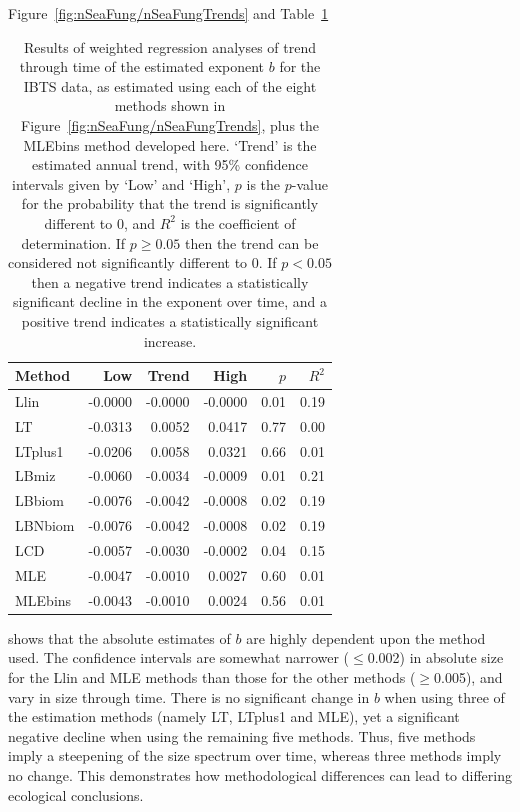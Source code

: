 \documentclass[12pt, letter]{article}
\begin{document}
Figure~\ref{fig:nSeaFung/nSeaFungTrends} and Table~\ref{tab:trendRes}
\begin{table}[tp]
\centering
\caption{Results of weighted regression analyses of trend through time of the
  estimated exponent $b$ for the IBTS data,
  as estimated using each of the eight methods shown
  in Figure~\ref{fig:nSeaFung/nSeaFungTrends}, plus the MLEbins method
  developed here.
  `Trend' is the estimated annual
  trend, with 95\% confidence intervals given by `Low' and `High', $p$ is the
  $p$-value for the probability that the trend is significantly different to 0,
  and $R^2$ is the coefficient of determination. If $p \geq 0.05$ then the
  trend can be considered not significantly different to 0. If $p<0.05$ then a
  negative trend indicates a statistically significant decline in the exponent
  over time, and a positive trend indicates a statistically significant
  increase.}
\label{tab:trendRes}
\begin{tabular}{lrrrrr}
\hline Method & Low & Trend & High & $p$ & $R^2$ \\    %
\hline
Llin & -0.0000 & -0.0000 & -0.0000 & 0.01 & 0.19 \\    %
LT & -0.0313 & 0.0052 & 0.0417 & 0.77 & 0.00 \\        %
LTplus1 & -0.0206 & 0.0058 & 0.0321 & 0.66 & 0.01 \\   %
LBmiz & -0.0060 & -0.0034 & -0.0009 & 0.01 & 0.21 \\   %
LBbiom & -0.0076 & -0.0042 & -0.0008 & 0.02 & 0.19 \\  %
LBNbiom & -0.0076 & -0.0042 & -0.0008 & 0.02 & 0.19 \\ %
LCD & -0.0057 & -0.0030 & -0.0002 & 0.04 & 0.15 \\     %
MLE & -0.0047 & -0.0010 & 0.0027 & 0.60 & 0.01 \\      %
\hline
MLEbins & -0.0043 & -0.0010 & 0.0024 & 0.56 & 0.01 \\  %
\hline
\end{tabular}
\end{table}
shows that the absolute estimates of
$b$ are highly dependent upon the method used. The confidence intervals are
somewhat narrower ($\leq$0.002) in absolute size for the Llin and MLE methods than those for
the other methods ($\geq$0.005),
and vary in size through time. There is no significant change in $b$ when
using three of the estimation methods (namely LT, LTplus1 and MLE), yet a
significant negative decline when using the remaining five methods. Thus, five
methods imply a steepening of the size spectrum over time, whereas three methods
imply no change. This demonstrates how methodological differences can lead to
differing ecological conclusions.  %
\end{document}
